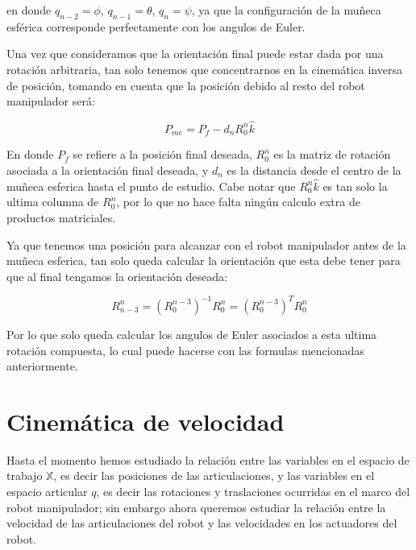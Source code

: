 \begin{multicols*}{2}
            en donde $q_{n-2} = \phi$, $q_{n-1} = \theta$, $q_{n} = \psi$, ya que la configuración de la muñeca esférica corresponde perfectamente con los angulos de Euler.

            Una vez que consideramos que la orientación final puede estar dada por una rotación arbitraria, tan solo tenemos que concentrarnos en la cinemática inversa de posición, tomando en cuenta que la posición debido al resto del robot manipulador será:

            \begin{equation}
                P_{me} = P_f - d_n R_0^n \hat{k}
            \end{equation}

            En donde $P_f$ se refiere a la posición final deseada, $R_0^n$ es la matriz de rotación asociada a la orientación final deseada, y $d_n$ es la distancia desde el centro de la muñeca esferica hasta el punto de estudio. Cabe notar que $R_0^n \hat{k}$ es tan solo la ultima columna de $R_0^n$, por lo que no hace falta ningún calculo extra de productos matriciales.

            Ya que tenemos una posición para alcanzar con el robot manipulador antes de la muñeca esferica, tan solo queda calcular la orientación que esta debe tener para que al final tengamos la orientación deseada:

            \begin{equation}
                R_{n-3}^n = \left( R_0^{n-3} \right)^{-1} R_0^n = \left( R_0^{n-3} \right)^T R_0^n
            \end{equation}

            Por lo que solo queda calcular los angulos de Euler asociados a esta ultima rotación compuesta, lo cual puede hacerse con las formulas mencionadas anteriormente.


    \section{Cinemática de velocidad}

        Hasta el momento hemos estudiado la relación entre las variables en el espacio de trabajo $\mathbb{X}$, es decir las posiciones de las articulaciones, y las variables en el espacio articular $q$, es decir las rotaciones y traslaciones ocurridas en el marco del robot manipulador; sin embargo ahora queremos estudiar la relación entre la velocidad de las articulaciones del robot y las velocidades en los actuadores del robot.


\end{multicols*}
